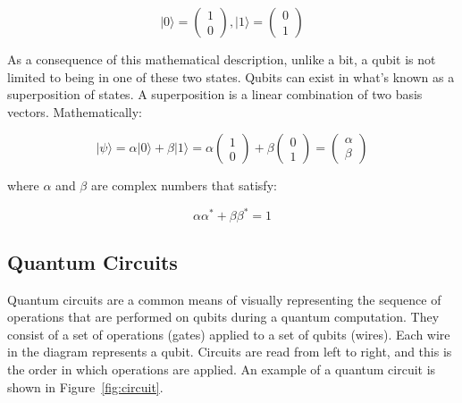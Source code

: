 \begin{linenomath}
\begin{equation}
	\vert 0 \rangle = \begin{pmatrix} 1 \\ 0 \end{pmatrix}, \vert 1 \rangle = \begin{pmatrix} 0 \\ 1 \end{pmatrix}
\label{eq:qu01}
\end{equation}
\end{linenomath}

As a consequence of this mathematical description, unlike a bit, a qubit is not 
limited to being in one of these two states. Qubits can exist in what's known as
a superposition of states. A superposition is a linear combination of two basis 
vectors. Mathematically:

\begin{linenomath}
\begin{equation}
	\vert \psi \rangle = \alpha \vert 0 \rangle + \beta \vert 1 \rangle = \alpha \begin{pmatrix} 1 \\ 0 \end{pmatrix} + \beta \begin{pmatrix} 0 \\ 1 \end{pmatrix} = \begin{pmatrix} \alpha \\ \beta \end{pmatrix}
\label{eq:supos}
\end{equation}
\end{linenomath}
where $\alpha$ and $\beta$ are complex numbers that satisfy:
\begin{linenomath}
\begin{equation}
	\alpha\alpha^* + \beta\beta^* =1
\label{eq:norm}
\end{equation}
\end{linenomath}

\subsection{Quantum Circuits}
\label{sec:circuit}

Quantum circuits are a common means of visually representing the sequence of 
operations that are performed on qubits during a quantum computation. They 
consist of a set of operations (gates) applied to a set of qubits (wires). Each 
wire in the diagram represents a qubit. Circuits are read from left to right, 
and this is the order in which operations are applied.
An example of a quantum circuit is shown in Figure~\ref{fig:circuit}.

